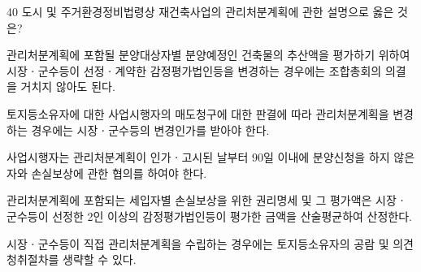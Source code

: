 \begin{question}{40}
도시 및 주거환경정비법령상 재건축사업의 관리처분계획에 관한 설명으로 옳은 것은?
\begin{choices}
  \item 관리처분계획에 포함될 분양대상자별 분양예정인 건축물의 추산액을 평가하기 위하여 시장ㆍ군수등이 선정ㆍ계약한 감정평가법인등을 변경하는 경우에는 조합총회의 의결을 거치지 않아도 된다.
  \item 토지등소유자에 대한 사업시행자의 매도청구에 대한 판결에 따라 관리처분계획을 변경하는 경우에는 시장ㆍ군수등의 변경인가를 받아야 한다.
  \item 사업시행자는 관리처분계획이 인가ㆍ고시된 날부터 90일 이내에 분양신청을 하지 않은 자와 손실보상에 관한 협의를 하여야 한다.
  \item 관리처분계획에 포함되는 세입자별 손실보상을 위한 권리명세 및 그 평가액은 시장ㆍ군수등이 선정한 2인 이상의 감정평가법인등이 평가한 금액을 산술평균하여 산정한다.
  \item 시장ㆍ군수등이 직접 관리처분계획을 수립하는 경우에는 토지등소유자의 공람 및 의견청취절차를 생략할 수 있다.
\end{choices}
\end{question}
